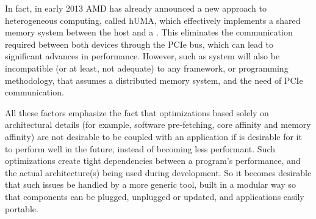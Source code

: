 \documentclass[main.tex]{subfiles}
\begin{document}
In fact, in early 2013 AMD has already announced a new approach to heterogeneous computing, called \acs{hUMA}, which effectively implements a shared memory system between the host \cpu and a \gpu \cite{hUMA}. This eliminates the communication required between both devices through the \acs{PCIe} bus, which can lead to significant advances in performance. However, such as system will also be incompatible (or at least, not adequate) to any framework, or programming methodology, that assumes a distributed memory system, and the need of \acs{PCIe} communication.

All these factors emphasize the fact that optimizations based solely on architectural details (for example, software pre-fetching, core affinity and memory affinity) are not desirable to be coupled with an application if is desirable for it to perform well in the future, instead of becoming less performant. Such optimizations create tight dependencies between a program's performance, and the actual architecture(s) being used during development. So it becomes desirable that such issues be handled by a more generic tool, built in a modular way so that components can be plugged, unplugged or updated, and applications easily portable.
\end{document}

